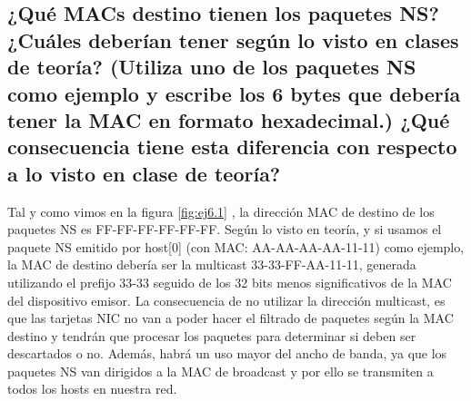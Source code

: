 \subsection{¿Qué MACs destino tienen los paquetes NS? ¿Cuáles deberían tener según lo visto en clases de teoría? (Utiliza uno de los paquetes NS como ejemplo y escribe los 6 bytes que debería tener la MAC en formato hexadecimal.) ¿Qué consecuencia tiene esta diferencia con respecto a lo visto en clase de teoría?}
\begin{flushleft}
    Tal y como vimos en la figura \ref{fig:ej6.1} , la dirección MAC de destino de los paquetes NS es FF-FF-FF-FF-FF-FF. Según lo visto en teoría, y si usamos el paquete NS emitido por host[0] (con MAC: AA-AA-AA-AA-11-11) como ejemplo, la MAC de destino debería ser la multicast 33-33-FF-AA-11-11, generada utilizando el prefijo 33-33 seguido de los 32 bits menos significativos de la MAC del dispositivo emisor. La consecuencia de no utilizar la dirección multicast, es que las tarjetas NIC no van a poder hacer el filtrado de paquetes según la MAC destino y tendrán que procesar los paquetes para determinar si deben ser descartados o no. Además, habrá un uso mayor del ancho de banda, ya que los paquetes NS van dirigidos a la MAC de broadcast y por ello se transmiten a todos los hosts en nuestra red.
\end{flushleft}


